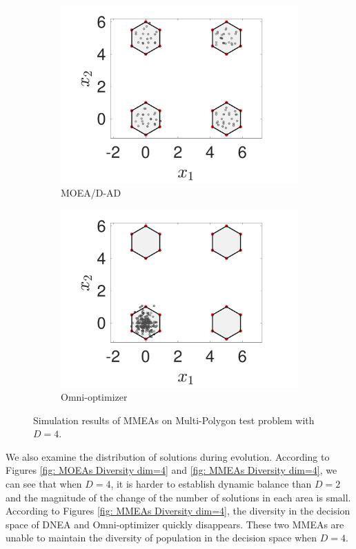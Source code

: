 \documentclass[conference]{IEEEtran}
\begin{document}
\begin{figure}[htbp]
    \begin{subfigure}[b]{.22\textwidth}
    \includegraphics[width=\linewidth]{Section5/dim4/PS/MOEADAD}
    \caption{MOEA/D-AD}
    \end{subfigure}
    \begin{subfigure}[b]{.22\textwidth}
    \includegraphics[width=\linewidth]{Section5/dim4/PS/OmniOptimizer}
    \caption{Omni-optimizer}
    \end{subfigure}
    \caption{Simulation results of MMEAs on Multi-Polygon test problem with $D=4$.}
    \label{fig: MMEAs PS dim=4}
\end{figure}

We also examine the distribution of solutions during evolution. According to Figures \ref{fig: MOEAs Diversity dim=4} and \ref{fig: MMEAs Diversity dim=4}, we can see that when $D=4$, it is harder to establish dynamic balance than $D=2$ and the magnitude of the change of the number of solutions in each area is small. According to Figures \ref{fig: MMEAs Diversity dim=4}, the diversity in the decision space of DNEA and Omni-optimizer quickly disappears. These two MMEAs are unable to maintain the diversity of population in the decision space when $D=4$. 
\end{document}
